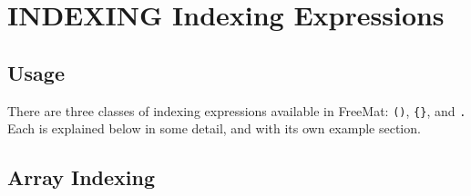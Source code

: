 \section{INDEXING Indexing Expressions}

\subsection{Usage}

There are three classes of indexing expressions available
in FreeMat: \verb|()|, \verb|{}|, and \verb|.|  Each is explained below
in some detail, and with its own example section.
\subsection{Array Indexing}

